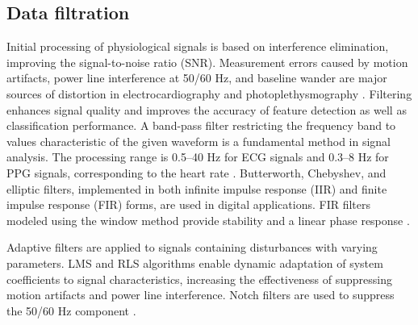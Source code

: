 \documentclass[journal]{IEEEtran}
\begin{document}
\subsection{Data filtration}
Initial processing of physiological signals is based on interference elimination, improving the signal-to-noise ratio (SNR). Measurement errors caused by motion artifacts, power line interference at 50/60 Hz, and baseline wander are major sources of distortion in electrocardiography and photoplethysmography \cite{2}. Filtering enhances signal quality and improves the accuracy of feature detection as well as classification performance.
A band-pass filter restricting the frequency band to values characteristic of the given waveform is a fundamental method in signal analysis. The processing range is 0.5–40 Hz for ECG signals and 0.3–8 Hz for PPG signals, corresponding to the heart rate \cite{3}. Butterworth, Chebyshev, and elliptic filters, implemented in both infinite impulse response (IIR) and finite impulse response (FIR) forms, are used in digital applications. FIR filters modeled using the window method provide stability and a linear phase response \cite{4}.

Adaptive filters are applied to signals containing disturbances with varying parameters. LMS and RLS algorithms enable dynamic adaptation of system coefficients to signal characteristics, increasing the effectiveness of suppressing motion artifacts and power line interference. Notch filters are used to suppress the 50/60 Hz component \cite{5}.
\end{document}
